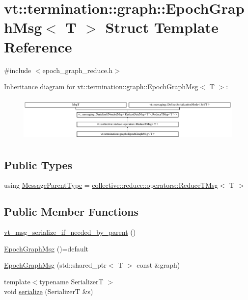 \hypertarget{structvt_1_1termination_1_1graph_1_1_epoch_graph_msg}{}\section{vt\+:\+:termination\+:\+:graph\+:\+:Epoch\+Graph\+Msg$<$ T $>$ Struct Template Reference}
\label{structvt_1_1termination_1_1graph_1_1_epoch_graph_msg}


{\ttfamily \#include $<$epoch\+\_\+graph\+\_\+reduce.\+h$>$}

Inheritance diagram for vt\+:\+:termination\+:\+:graph\+:\+:Epoch\+Graph\+Msg$<$ T $>$\+:\begin{figure}[H]
\begin{center}
\leavevmode
\includegraphics[height=2.299795cm]{structvt_1_1termination_1_1graph_1_1_epoch_graph_msg}
\end{center}
\end{figure}
\subsection*{Public Types}
\begin{DoxyCompactItemize}
\item 
using \hyperlink{structvt_1_1termination_1_1graph_1_1_epoch_graph_msg_ae8827a1b3949d471a0de4d107f20eb02}{Message\+Parent\+Type} = \hyperlink{structvt_1_1collective_1_1reduce_1_1operators_1_1_reduce_t_msg}{collective\+::reduce\+::operators\+::\+Reduce\+T\+Msg}$<$ T $>$
\end{DoxyCompactItemize}
\subsection*{Public Member Functions}
\begin{DoxyCompactItemize}
\item 
\hyperlink{structvt_1_1termination_1_1graph_1_1_epoch_graph_msg_a88e8c54930cda6396ffcec2d1223b97f}{vt\+\_\+msg\+\_\+serialize\+\_\+if\+\_\+needed\+\_\+by\+\_\+parent} ()
\item 
\hyperlink{structvt_1_1termination_1_1graph_1_1_epoch_graph_msg_a7dd7c3313549d4d61f614bc1ec38a13b}{Epoch\+Graph\+Msg} ()=default
\item 
\hyperlink{structvt_1_1termination_1_1graph_1_1_epoch_graph_msg_a3d594c68531bdbc1b114f4b52557d648}{Epoch\+Graph\+Msg} (std\+::shared\+\_\+ptr$<$ T $>$ const \&graph)
\item 
{\footnotesize template$<$typename SerializerT $>$ }\\void \hyperlink{structvt_1_1termination_1_1graph_1_1_epoch_graph_msg_af799d374db4de6b194128e4032e3d412}{serialize} (SerializerT \&s)
\end{DoxyCompactItemize}
